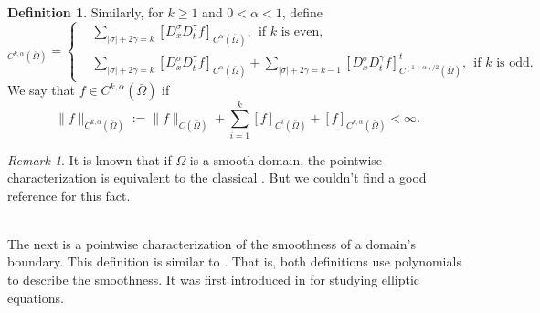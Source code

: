 \documentclass[preprint,12pt]{elsarticle}
\theoremstyle{definition}
\newtheorem{definition}[theorem]{Definition}
\theoremstyle{remark}
\newtheorem{remark}[theorem]{Remark}
\numberwithin{equation}{section}
\begin{document}
\begin{definition}
Similarly, for $k\geq 1$ and $0< \alpha< 1$, define
\begin{equation*}
  [f]_{C^{k,\alpha}(\bar{\Omega})}=\left\{
  \begin{aligned}
&\sum_{|\sigma|+2\gamma= k}[D_{x}^{\sigma}D_{t}^{\gamma}f]_{C^{\alpha}(\bar{\Omega})},~~
\mbox{if $k$ is even},~~\\
&\sum_{|\sigma|+2\gamma= k}[D_{x}^{\sigma}D_{t}^{\gamma}f]_{C^{\alpha}(\bar{\Omega})}
+\sum_{|\sigma|+2\gamma= k-1}
[D_{x}^{\sigma}D_{t}^{\gamma}f]^{t}_{C^{(1+\alpha)/2}(\bar{\Omega})},~~
\mbox{if $k$ is odd}.
  \end{aligned}
  \right.
\end{equation*}
We say that $f\in C^{k,\alpha}(\bar\Omega)$ if
\begin{equation*}
\|f\|_{C^{k,\alpha}(\bar{\Omega})}:=\|f\|_{C(\bar{\Omega})}+\sum_{i=1}^{k}[f]_{C^i(\bar{\Omega})}
+[f]_{C^{k,\alpha}(\bar{\Omega})}<\infty.
\end{equation*}
\end{definition}

\begin{remark}\label{re1.9}
It is known that if $\Omega$ is a smooth domain, the pointwise characterization  is equivalent to the classical . But we couldn't find a good reference for this fact.
\end{remark}
~\\

The next is a pointwise characterization of the smoothness of a domain's boundary. This definition is similar to . That is, both definitions use polynomials to describe the smoothness. It was first introduced in \cite{MR4088470} for studying elliptic equations.
\end{document}
